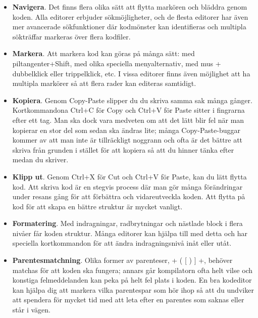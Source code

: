 \begin{itemize}
\item \textbf{Navigera}. Det finns flera olika sätt att flytta markören och bläddra genom koden. Alla editorer erbjuder sökmöjligheter, och de flesta editorer har även mer avancerade sökfunktioner där kodmönster kan identifieras och multipla sökträffar markeras över flera kodfiler.

\item \textbf{Markera}. Att markera kod kan göras på många sätt: med piltangenter+Shift, med olika speciella menyalternativ, med mus + dubbelklick eller trippelklick, etc. I vissa editorer finns även möjlighet att ha multipla markörer så att flera rader kan editeras samtidigt.

\item \textbf{Kopiera}. Genom Copy-Paste slipper du du skriva samma sak många gånger. Kortkommandona Ctrl+C för Copy och Ctrl+V för Paste sitter i fingrarna efter ett tag. Man ska dock vara medveten om att det lätt blir fel när man kopierar en stor del som sedan ska ändras lite; många Copy-Paste-buggar kommer av att man inte är tillräckligt noggrann och ofta är det bättre att skriva från grunden i stället för att kopiera så att du hinner tänka efter medan du skriver.

\item \textbf{Klipp ut}. Genom Ctrl+X för Cut och Ctrl+V för Paste, kan du lätt flytta kod. Att skriva kod är en stegvis process där man gör många förändringar under resans gång för att förbättra och vidareutveckla koden. Att flytta på kod för att skapa en bättre struktur är mycket vanligt.

\item \textbf{Formatering}. Med indragningar, radbrytningar och nästlade block i flera nivåer får koden struktur. Många editorer kan hjälpa till med detta och har speciella kortkommandon för att ändra indragningsnivå inåt eller utåt.

\item \textbf{Parentesmatchning}. Olika former av parenteser, \code+ ( { [ ) } ] +,  behöver matchas för att koden ska fungera; annars går kompilatorn ofta helt vilse och konstiga felmeddelanden kan peka på helt fel plats i koden. En bra kodeditor kan hjälpa dig att markera vilka parentespar som hör ihop så att du undviker att spendera för mycket tid med att leta efter en parentes som saknas eller står i vägen.

\end{itemize}

